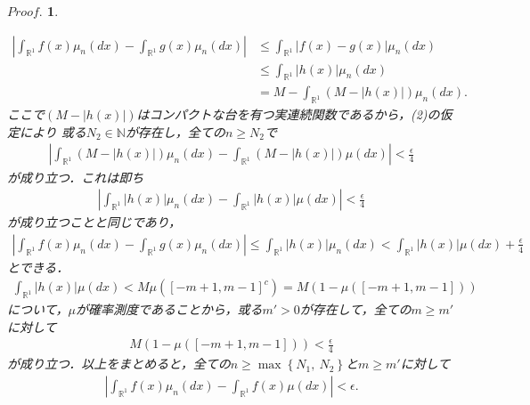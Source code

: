 \documentclass[a4j,papersize,disablejfam,slide,14pt]{jsarticle}
\newtheorem{Proof}{$Proof.$}
\def\max#1#2{\operatorname{max} \left\{ #1,\ #2 \right\}} %
\begin{document}
\begin{Proof}
\begin{description}
                \begin{align}
                	\left| \int_{\mathbb{R}^1} f(x)\mu_n(dx) - \int_{\mathbb{R}^1} g(x)\mu_n(dx) \right| 
                    &\leq \int_{\mathbb{R}^1} \left| f(x) - g(x) \right| \mu_n(dx) \\
                    &\leq \int_{\mathbb{R}^1} \left| h(x) \right| \mu_n(dx) \\
                    &= M - \int_{\mathbb{R}^1} (M - \left| h(x) \right|) \mu_n(dx).
                \end{align}
                ここで$(M - \left| h(x) \right|)$はコンパクトな台を有つ実連続関数であるから，(2)の仮定により
                或る$N_2 \in \mathbb{N}$が存在し，全ての$n \geq N_2$で
                \begin{align}
                	\left| \int_{\mathbb{R}^1} (M - \left| h(x) \right|) \mu_n(dx) - \int_{\mathbb{R}^1} (M - \left| h(x) \right|) \mu(dx) \right| < \frac{\epsilon}{4}
                \end{align}
                が成り立つ．これは即ち
                \begin{align}
                	\left| \int_{\mathbb{R}^1} \left| h(x) \right| \mu_n(dx) - \int_{\mathbb{R}^1} \left| h(x) \right| \mu(dx) \right| < \frac{\epsilon}{4}
                \end{align}
                が成り立つことと同じであり，
                \begin{align}
                	\left| \int_{\mathbb{R}^1} f(x)\mu_n(dx) - \int_{\mathbb{R}^1} g(x)\mu_n(dx) \right| 
                    \leq \int_{\mathbb{R}^1} \left| h(x) \right| \mu_n(dx)
                    < \int_{\mathbb{R}^1} \left| h(x) \right| \mu(dx) + \frac{\epsilon}{4}
                \end{align}
                とできる．
                \begin{align}
                	\int_{\mathbb{R}^1} \left| h(x) \right| \mu(dx) < M \mu([-m+1,m-1]^c) = M (1 - \mu([-m+1,m-1]))
                \end{align}
                について，$\mu$が確率測度であることから，或る$m'>0$が存在して，全ての$m \geq m'$に対して
                \begin{align}
                	M (1 - \mu([-m+1,m-1])) < \frac{\epsilon}{4}
                \end{align}
                が成り立つ．以上をまとめると，全ての$n \geq \max{N_1}{N_2}$と$m \geq m'$に対して
                \begin{align}
                	\left| \int_{\mathbb{R}^1} f(x)\mu_n(dx) - \int_{\mathbb{R}^1} f(x)\mu(dx) \right|  < \epsilon.

\end{align}
\end{description}
\end{Proof}
\end{document}
